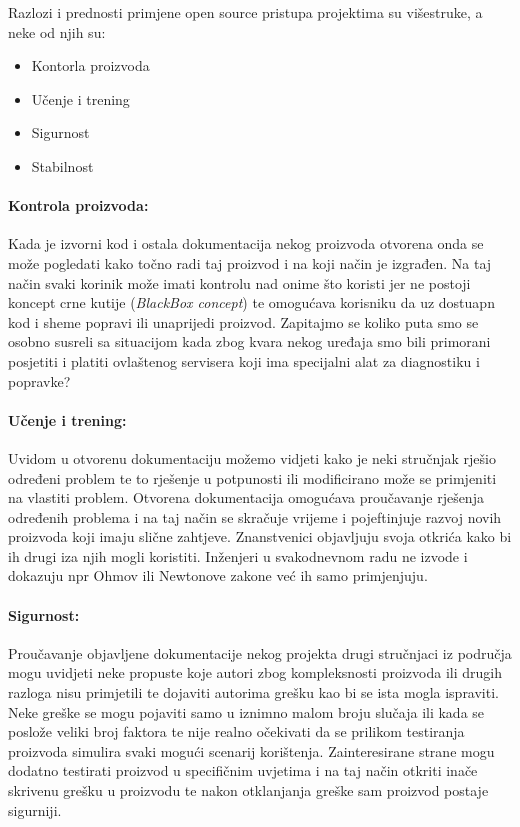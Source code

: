 Razlozi i prednosti primjene open source pristupa projektima su višestruke, a neke od njih su:
\begin{itemize}
\item Kontorla proizvoda
\item Učenje i trening
\item Sigurnost
\item Stabilnost
\end{itemize}

\paragraph{Kontrola proizvoda:}
Kada je izvorni kod i ostala dokumentacija nekog proizvoda otvorena onda se može pogledati kako točno radi taj proizvod i na koji način je izgrađen.
Na taj način svaki korinik može imati kontrolu nad onime što koristi jer ne postoji koncept crne kutije (\textit{BlackBox concept}) te omogućava korisniku da uz dostuapn kod i sheme popravi ili unaprijedi proizvod.
Zapitajmo se koliko puta smo se osobno susreli sa situacijom kada zbog kvara nekog uređaja smo bili primorani posjetiti i platiti ovlaštenog servisera koji ima specijalni alat za diagnostiku i popravke?

\paragraph{Učenje i trening:}
Uvidom u otvorenu dokumentaciju možemo vidjeti kako je neki stručnjak rješio određeni problem te to rješenje u potpunosti ili modificirano može se primjeniti na vlastiti problem.
Otvorena dokumentacija omogućava proučavanje rješenja određenih problema i na taj način se skračuje vrijeme i pojeftinjuje razvoj novih proizvoda koji imaju slične zahtjeve.
Znanstvenici objavljuju svoja otkrića kako bi ih drugi iza njih mogli koristiti.
Inženjeri u svakodnevnom radu ne izvode i dokazuju npr Ohmov ili Newtonove zakone već ih samo primjenjuju.

\paragraph{Sigurnost:}
Proučavanje objavljene dokumentacije nekog projekta drugi stručnjaci iz područja mogu uvidjeti neke propuste koje autori zbog kompleksnosti proizvoda ili drugih razloga nisu primjetili te dojaviti autorima grešku kao bi se ista mogla ispraviti. 
Neke greške se mogu pojaviti samo u iznimno malom broju slučaja ili kada se poslože veliki broj faktora te nije realno očekivati da se prilikom testiranja proizvoda simulira svaki mogući scenarij korištenja.
Zainteresirane strane mogu dodatno testirati proizvod u specifičnim uvjetima i na taj način otkriti inače skrivenu grešku u proizvodu te nakon otklanjanja greške sam proizvod postaje sigurniji.

